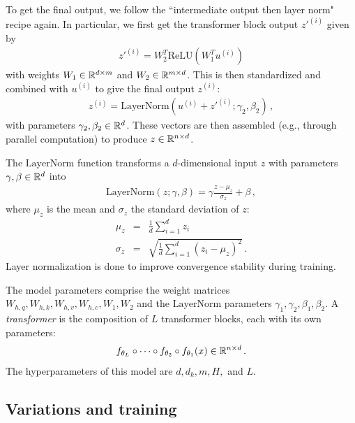 To get the final output, we follow the ``intermediate output then layer norm" recipe again. In particular, we first get the transformer block output ${z'}^{(i)}$ given by
\begin{eqnarray}
  {z'}^{(i)} = W_2^T \text{ReLU}\left( W_1^T u^{(i)} \right)
\end{eqnarray}
with weights $W_1\in \mathbb{R}^{d\times m}$ and $W_2\in \mathbb{R}^{m\times d}$.  This is then standardized and combined with $u^{(i)}$ to give the final output $z^{(i)}$:
\begin{eqnarray}
  {z}^{(i)} = \text{LayerNorm}\left(  u^{(i)} + {z'}^{(i)}; \gamma_2, \beta_2  \right)
  \,,
\end{eqnarray}
with parameters $\gamma_2, \beta_2 \in \mathbb{R}^{d}$.  These vectors are then assembled (e.g., through parallel computation) to produce $z\in \mathbb{R}^{n\times d}$.

The $\text{LayerNorm}$ function transforms a $d$-dimensional input $z$ with parameters $\gamma, \beta \in \mathbb{R}^d$ into
\begin{eqnarray}
  \text{LayerNorm}(z; \gamma, \beta) = \gamma \frac{z-\mu_z}{\sigma_z} + \beta
  \,,
\end{eqnarray}
where $\mu_z$ is the mean and $\sigma_z$ the standard deviation of $z$:
\begin{eqnarray}
  \mu_z &=& \frac{1}{d} \sum_{i=1}^d z_i
  \\
  \sigma_z &=& \sqrt{ \frac{1}{d} \sum_{i=1}^d (z_i-\mu_z)^2 }
  \,.
\end{eqnarray}
Layer normalization is done to improve convergence stability during training.

The model parameters comprise the weight matrices $W_{h,q}, W_{h,k}, W_{h,v}, W_{h,c}, W_1, W_2$ and the $\text{LayerNorm}$ parameters $\gamma_1, \gamma_2, \beta_1, \beta_2$.  A {\em transformer} is the composition of $L$ transformer blocks, each with its own parameters:
\begin{eqnarray}
  f_{\theta_L} \circ  \cdots \circ f_{\theta_2} \circ f_{\theta_1}(x) \in \mathbb{R}^{n\times d}
  \,.
\end{eqnarray}
The hyperparameters of this model are $d, d_k, m, H,$ and $L.$




\subsection{Variations and training}

